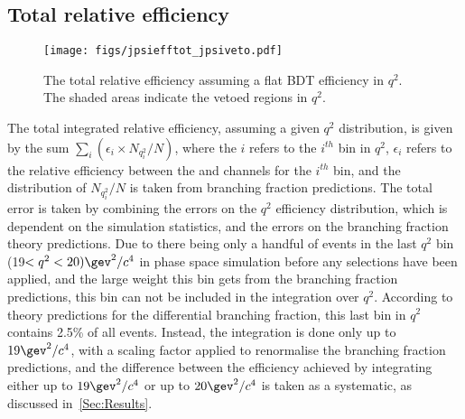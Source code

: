 

 
\subsection{Total relative efficiency}
\label{sec:toteff}
\begin{figure}[!t]\def\nh{0.3\textwidth}
  \centering
  \texttt{[image: figs/jpsiefftot\_jpsiveto.pdf]}
    \caption{The total relative efficiency assuming a flat BDT efficiency in $q^{2}$. The shaded areas indicate the vetoed regions in $q^{2}$.}
\label{Fig:toteff}

\end{figure}
The total integrated relative efficiency, assuming a given $q^{2}$ distribution, is given by the sum $\sum_{i} (\epsilon_{i}\times N_{q^{2}_{i}}/N)$, where the $i$ refers to the $i^{th}$ bin in $q^{2}$, $\epsilon_{i}$ refers to the relative efficiency between the \Lbpi and \Lbpijpsi channels for the $i^{th}$ bin, and the distribution of $N_{q^{2}_{i}}/N$ is taken from \LbL branching fraction predictions. The total error is taken by combining the errors on the $q^{2}$ efficiency distribution, which is dependent on the simulation statistics, and the errors on the \LbL branching fraction theory predictions. Due to there being only a handful of events in the last $q^{2}$ bin (19$<q^{2}<20) \gev^{2}/c^{4}$ in phase space simulation before any selections have been applied, and the large weight this bin gets from the \LbL branching fraction predictions, this bin can not be included in the integration over $q^{2}$. According to \LbL theory predictions for the differential branching fraction, this last bin in $q^{2}$ contains 2.5\% of all events. Instead, the integration is done only up to $19 \gev^{2}/c^{4}$, with a scaling factor applied to renormalise the \LbL branching fraction predictions, and the difference between the efficiency achieved by integrating either up to $19 \gev^{2}/c^{4}$ or up to $20 \gev^{2}/c^{4}$ is taken as a systematic, as discussed in~\autoref{Sec:Results}. 


